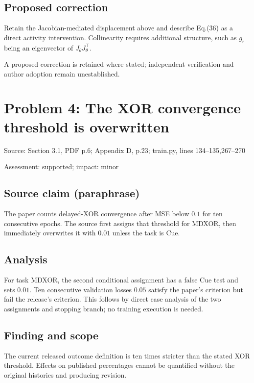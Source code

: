 \documentclass[11pt]{article}
\begin{document}
\subsection*{Proposed correction}

Retain the Jacobian-mediated displacement above and describe Eq.(36) as a direct activity intervention. Collinearity requires additional structure, such as \(g_r\) being an eigenvector of \(J_\theta J_\theta^\top\).

A proposed correction is retained where stated; independent verification and author adoption remain unestablished.

\section*{Problem 4: The XOR convergence threshold is overwritten}

Source: Section 3.1, PDF p.6; Appendix D, p.23; train.py, lines 134–135,267–270

Assessment: supported; impact: minor

\subsection*{Source claim (paraphrase)}

The paper counts delayed-XOR convergence after MSE below \(0.1\) for ten consecutive epochs. The source first assigns that threshold for MDXOR, then immediately overwrites it with \(0.01\) unless the task is Cue.

\subsection*{Analysis}

For task MDXOR, the second conditional assignment has a false Cue test and sets \(0.01\). Ten consecutive validation losses \(0.05\) satisfy the paper’s criterion but fail the release’s criterion. This follows by direct case analysis of the two assignments and stopping branch; no training execution is needed.

\subsection*{Finding and scope}

The current released outcome definition is ten times stricter than the stated XOR threshold. Effects on published percentages cannot be quantified without the original histories and producing revision.
\end{document}

